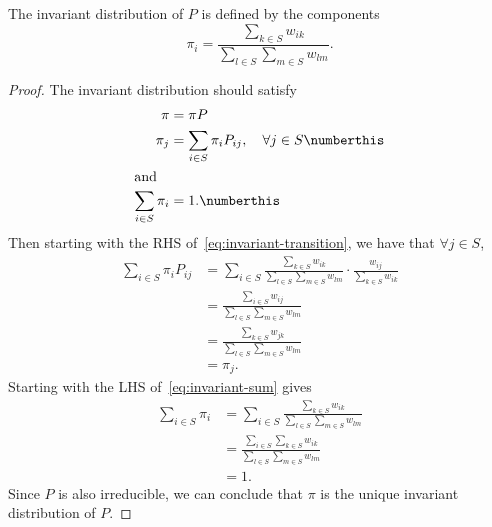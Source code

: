 \documentclass[
  coursecode={MTHE 455},
  assignmentname={Assignment \assignmentnumber},
  studentnumber=20053722,
  name={Bryan Hoang},
  draft,
]{
  ltxanswer%
}
\begin{document}
\begin{questions}
\begin{parts}
      \part{}
      \begin{solution}
        \begin{claim}
          The invariant distribution of \(P\) is defined by the components
          \begin{equation*}
            \pi_{i} = \frac{\sum_{k \in S} w_{ik}}{\sum_{l \in S} \sum_{m \in S} w_{lm}}.
          \end{equation*}
        \end{claim}
        \begin{proof}
          The invariant distribution should satisfy
          \begin{align*}
            \pi                    &= \pi P                                                                                          \\
            \pi_{j}                &= \sum_{i \in S} \pi_{i} P_{ij}, \quad \forall j \in S\numberthis\label{eq:invariant-transition} \\
            \intertext{and}
            \sum_{i \in S} \pi_{i} &= 1.\numberthis\label{eq:invariant-sum}
          \end{align*}
          Then starting with the RHS of~\eqref{eq:invariant-transition}, we have that \(\forall j \in S\),
          \begin{align*}
            \sum_{i \in S} \pi_{i} P_{ij} &= \sum_{i \in S} \frac{\sum_{k \in S} w_{ik}}{\sum_{l \in S} \sum_{m \in S} w_{lm}} \cdot \frac{w_{ij}}{\sum_{k \in S} w_{ik}} \\
                                          &=  \frac{\sum_{i \in S} w_{ij}}{\sum_{l \in S} \sum_{m \in S} w_{lm}}                                                          \\
                                          &=  \frac{\sum_{k \in S} w_{jk}}{\sum_{l \in S} \sum_{m \in S} w_{lm}}                                                          \\
                                          &= \pi_{j}.
          \end{align*}
          Starting with the LHS of~\eqref{eq:invariant-sum} gives
          \begin{align*}
            \sum_{i \in S} \pi_{i} &= \sum_{i \in S} \frac{\sum_{k \in S} w_{ik}}{\sum_{l \in S} \sum_{m \in S} w_{lm}} \\
                                   &= \frac{\sum_{i \in S} \sum_{k \in S} w_{ik}}{\sum_{l \in S} \sum_{m \in S} w_{lm}} \\
                                   &= 1.
          \end{align*}
          Since \(P\) is also irreducible, we can conclude that \(\pi\) is the unique invariant distribution of \(P\).
        \end{proof}
      \end{solution}


\end{parts}
\end{questions}
\end{document}
